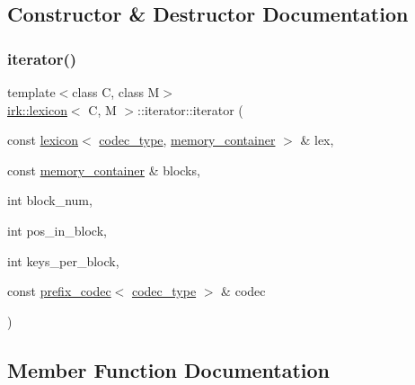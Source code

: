 \subsection{Constructor \& Destructor Documentation}
\mbox{\label{classirk_1_1lexicon_1_1iterator_a004a6a84da2be6ffb1bece079dee3ee8}} 
\subsubsection{\texorpdfstring{iterator()}{iterator()}}
{\footnotesize\ttfamily template$<$class C, class M$>$ \\
\mbox{\hyperlink{classirk_1_1lexicon}{irk\+::lexicon}}$<$ C, M $>$\+::iterator\+::iterator (\begin{DoxyParamCaption}\item[{const \mbox{\hyperlink{classirk_1_1lexicon}{lexicon}}$<$ \mbox{\hyperlink{classirk_1_1lexicon_a3ec38dbe131c7b0a9551d05ad619fc89}{codec\+\_\+type}}, \mbox{\hyperlink{classirk_1_1lexicon_a2097b1f4bfc324504a9fe10af681b0be}{memory\+\_\+container}} $>$ \&}]{lex,  }\item[{const \mbox{\hyperlink{classirk_1_1lexicon_a2097b1f4bfc324504a9fe10af681b0be}{memory\+\_\+container}} \&}]{blocks,  }\item[{int}]{block\+\_\+num,  }\item[{int}]{pos\+\_\+in\+\_\+block,  }\item[{int}]{keys\+\_\+per\+\_\+block,  }\item[{const \mbox{\hyperlink{classirk_1_1prefix__codec}{prefix\+\_\+codec}}$<$ \mbox{\hyperlink{classirk_1_1lexicon_a3ec38dbe131c7b0a9551d05ad619fc89}{codec\+\_\+type}} $>$ \&}]{codec }\end{DoxyParamCaption})\hspace{0.3cm}{\ttfamily [inline]}}



\subsection{Member Function Documentation}
\mbox{\label{classirk_1_1lexicon_1_1iterator_a4495eb3025afbf531deafa7afd451d8e}} 
